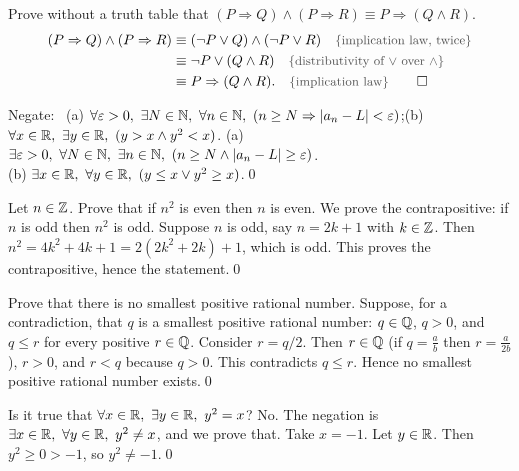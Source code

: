 \begin{hexample}
Prove without a truth table that $(P\Rightarrow Q)\wedge(P\Rightarrow R)\equiv P\Rightarrow(Q\wedge R)$.
\solution
\begin{align*}
(P\Rightarrow Q)\wedge(P\Rightarrow R)
&\equiv(\neg P\vee Q)\wedge(\neg P\vee R)\reason{implication law, twice}\\
&\equiv\neg P\vee(Q\wedge R)\reason{distributivity of $\vee$ over $\wedge$}\\
&\equiv P\Rightarrow(Q\wedge R).\reason{implication law}\qquad\square
\end{align*}
\end{hexample}

\begin{hexample}
Negate: \ (a) $\forall\varepsilon>0,\ \exists N\in\N,\ \forall n\in\N,\ (n\ge N\Rightarrow|a_n-L|<\varepsilon)$;\quad (b) $\forall x\in\mathbb{R},\ \exists y\in\mathbb{R},\ (y>x\wedge y^2<x)$.
\solution
(a) $\exists\varepsilon>0,\ \forall N\in\mathbb{N},\ \exists n\in\mathbb{N},\ (n\ge N\wedge|a_n-L|\ge\varepsilon)$.\\
(b) $\exists x\in\mathbb{R},\ \forall y\in\mathbb{R},\ (y\le x\vee y^2\ge x)$.\qed
\end{hexample}

\begin{hexample}[contraposition]
Let $n\in\mathbb{Z}$. Prove that if $n^2$ is even then $n$ is even.
\solution
We prove the contrapositive: if $n$ is odd then $n^2$ is odd. Suppose $n$ is odd, say $n=2k+1$ with $k\in\mathbb{Z}$. Then $n^2=4k^2+4k+1=2(2k^2+2k)+1$, which is odd. This proves the contrapositive, hence the statement.\qed
\end{hexample}

\begin{hexample}[contradiction]
Prove that there is no smallest positive rational number.
\solution
Suppose, for a contradiction, that $q$ is a smallest positive rational number: $q\in\mathbb{Q}$, $q>0$, and $q\le r$ for every positive $r\in\mathbb{Q}$. Consider $r=q/2$. Then $r\in\mathbb{Q}$ (if $q=\frac ab$ then $r=\frac a{2b}$), $r>0$, and $r<q$ because $q>0$. This contradicts $q\le r$. Hence no smallest positive rational number exists.\qed
\end{hexample}

\begin{hexample}
Is it true that $\forall x\in\mathbb{R},\ \exists y\in\mathbb{R},\ y^2=x$?
\solution
No. The negation is $\exists x\in\mathbb{R},\ \forall y\in\mathbb{R},\ y^2\neq x$, and we prove that. Take $x=-1$. Let $y\in\mathbb{R}$. Then $y^2\ge0>-1$, so $y^2\neq-1$.\qed
\end{hexample}


